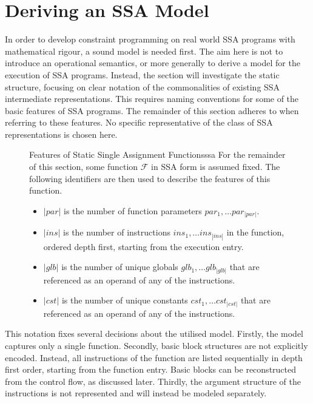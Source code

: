 \section{Deriving an SSA Model}

    In order to develop constraint programming on real world SSA programs with
    mathematical rigour, a sound model is needed first.
    The aim here is not to introduce an operational semantics, or more
    generally to derive a model for the execution of SSA programs.
    Instead, the section will investigate the static structure, focusing on
    clear notation of the commonalities of existing SSA intermediate
    representations.
    This requires naming conventions for some of the basic features of
    SSA programs.
    The remainder of this section adheres to  when referring to
    these features.
    No specific representative of the class of SSA representations is chosen
    here.

\begin{figure}[h]
\begin{definition}{Features of Static Single Assignment Functions}{ssa}
    For the remainder of this section, some function $\mathcal F$ in SSA form is
    assumed fixed. 
    The following identifiers are then used to describe the features of this
    function.

    \begin{itemize}
    \item $|par|$ is the number of function parameters
          $par_1,\dots par_{|par|}$.
    \item $|ins|$ is the number of instructions $ins_1,\dots ins_{|ins|}$ in the
          function, ordered depth first, starting from the execution entry.
    \item $|glb|$ is the number of unique globals $glb_1,\dots glb_{|glb|}$ that
          are referenced as an operand of any of the instructions.
    \item $|cst|$ is the number of unique constants $cst_1,\dots cst_{|cst|}$
          that are referenced as an operand of any of the instructions.
    \end{itemize}
\end{definition}
\end{figure}

    This notation fixes several decisions about the utilised model.
    Firstly, the model captures only a single function.
    Secondly, basic block structures are not explicitly encoded.
    Instead, all instructions of the function are listed sequentially in depth
    first order, starting from the function entry.
    Basic blocks can be reconstructed from the control flow, as discussed later.
    Thirdly, the argument structure of the instructions is not represented and
    will instead be modeled separately.

